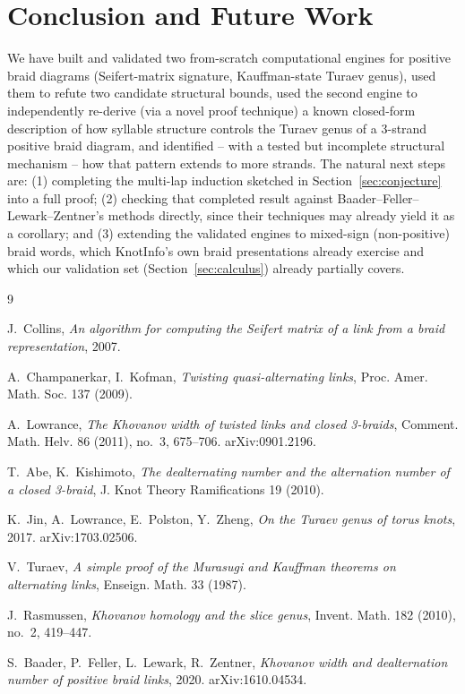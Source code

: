 \documentclass[11pt]{article}
\theoremstyle{definition}
\begin{document}
\section{Conclusion and Future Work}

We have built and validated two from-scratch computational engines for positive braid diagrams (Seifert-matrix signature, Kauffman-state Turaev genus), used them to refute two candidate structural bounds, used the second engine to independently re-derive (via a novel proof technique) a known closed-form description of how syllable structure controls the Turaev genus of a 3-strand positive braid diagram, and identified -- with a tested but incomplete structural mechanism -- how that pattern extends to more strands. The natural next steps are: (1) completing the multi-lap induction sketched in Section~\ref{sec:conjecture} into a full proof; (2) checking that completed result against Baader--Feller--Lewark--Zentner's methods \cite{bflz2020} directly, since their techniques may already yield it as a corollary; and (3) extending the validated engines to mixed-sign (non-positive) braid words, which KnotInfo's own braid presentations already exercise and which our validation set (Section~\ref{sec:calculus}) already partially covers.

\begin{thebibliography}{9}

 J.~Collins, \emph{An algorithm for computing the Seifert matrix of a link from a braid representation}, 2007.

 A.~Champanerkar, I.~Kofman, \emph{Twisting quasi-alternating links}, Proc. Amer. Math. Soc. 137 (2009).

 A.~Lowrance, \emph{The Khovanov width of twisted links and closed 3-braids}, Comment. Math. Helv. 86 (2011), no.~3, 675--706. arXiv:0901.2196.

 T.~Abe, K.~Kishimoto, \emph{The dealternating number and the alternation number of a closed 3-braid}, J. Knot Theory Ramifications 19 (2010).

 K.~Jin, A.~Lowrance, E.~Polston, Y.~Zheng, \emph{On the Turaev genus of torus knots}, 2017. arXiv:1703.02506.

 V.~Turaev, \emph{A simple proof of the Murasugi and Kauffman theorems on alternating links}, Enseign. Math. 33 (1987).

 J.~Rasmussen, \emph{Khovanov homology and the slice genus}, Invent. Math. 182 (2010), no.~2, 419--447.

 S.~Baader, P.~Feller, L.~Lewark, R.~Zentner, \emph{Khovanov width and dealternation number of positive braid links}, 2020. arXiv:1610.04534.

\end{thebibliography}
\end{document}
